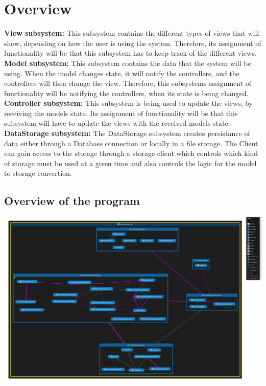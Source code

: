 \section{Overview}
\textbf{View subsystem:}
This subsystem contains the different types of views that will show, depending on how the user is 
using the system. Therefore, its assignment of functionality will be that this subsystem 
has to keep track of the different views.\\
\textbf{Model subsystem:}
This subsystem contains the data that the system will be using. When the model changes state, 
it will notify the controllers, and the controllers will then change the view. Therefore, 
this subsystems assignment of functionality will be notifying the controllers, 
when its state is being changed.\\
\textbf{Controller subsystem:}
This subsystem is being used to update the views, by receiving the models state. 
Its assignment of functionality will be that this subsystem will have to update the views 
with the received models state.\\
\textbf{DataStorage subsystem:}
The DataStorage subsystem creates persistance of data either through a Database connection or locally in a file storage. The Client can gain access to the storage through a storage client which controls which kind of storage must be used at a given time and also controls the logic for the model to storage convertion. 

\subsection{Overview of the program}
\includegraphics[scale=0.13]{OverallClassDependencies}\\

